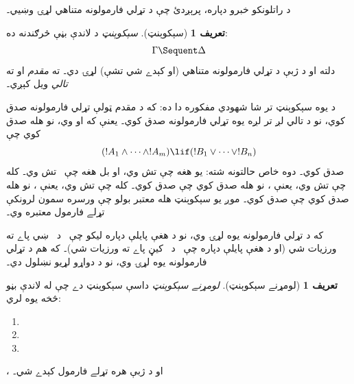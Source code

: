 \documentclass[12pt,a4paper,oneside]{report}
\theoremstyle{definition}
\newtheorem{defn}[thm]{تعريف}
\newenvironment{explain}{}{}
\begin{document}
\label{olpseg:OLP-0070-B005:start}
\label{olpseg:OLP-0070-B005:end}

\label{olpseg:OLP-0070-B006:start}
د راتلونکو خبرو دپاره، پرېږدئ چې \LR{$\Gamma, \Delta, \Pi, \Lambda$} د
تړلي فارمولونه متناهي لړۍ وښيي۔
\label{olpseg:OLP-0070-B006:end}

\label{olpseg:OLP-0070-B007:start}
\begin{defn}[سېکوېنټ]
\emph{سېکوېنټ} د لاندې بڼې څرګندنه ده:
\[
\Gamma \Sequent \Delta
\]
دلته \LR{$\Gamma$} او \LR{$\Delta$} د ژبې  د تړلي فارمولونه متناهي
(او کېدے شي تشې) لړۍ دي۔ \LR{$\Gamma$} ته \emph{مقدم} او \LR{$\Delta$} ته
\emph{تالي} ويل کېږي۔
\end{defn}
\label{olpseg:OLP-0070-B007:end}

\label{olpseg:OLP-0070-B008:start}
\begin{explain}
د يوه سېکوېنټ تر شا شهودي مفکوره دا ده: که د مقدم ټولې تړلي فارمولونه
صدق کوي، نو د تالي لږ تر لږه يوه تړلي فارمولونه صدق کوي۔ يعنې که
 او
 وي، نو \LR{$\Gamma \Sequent \Delta$}
هله صدق کوي چې
\[
(!A_1 \land \cdots \land !A_m) \lif (!B_1 \lor \cdots \lor
!B_n)
\]
صدق کوي۔ دوه خاص حالتونه شته: يو هغه چې \LR{$\Gamma$} تش وي، او بل هغه
چې \LR{$\Delta$}~تش وي۔ کله چې \LR{$\Gamma$} تش وي، يعنې ، نو \LR{$\quad
\Sequent \Delta$} هله صدق کوي چې  صدق
کوي۔ کله چې \LR{$\Delta$} تش وي، يعنې ، نو \LR{$\Gamma \Sequent \quad$}
هله صدق کوي چې  صدق کوي۔
موږ يو سېکوېنټ هله معتبر بولو چې ورسره سمون لرونکې تړلے فارمول
معتبره وي۔
\end{explain}
\label{olpseg:OLP-0070-B008:end}

\label{olpseg:OLP-0070-B009:start}
که \LR{$\Gamma$} د تړلي فارمولونه يوه لړۍ وي، نو  د هغې
پايلې دپاره ليکو چې~ د~\LR{$\Gamma$} ښي پاے ته ورزيات شي (او  د هغې پايلې دپاره چې~ د~\LR{$\Gamma$} کيڼ پاے ته ورزيات
شي)۔ که \LR{$\Delta$} هم د تړلي فارمولونه يوه لړۍ وي، نو \LR{$\Gamma,
\Delta$} د دواړو لړيو نښلول دي۔
\label{olpseg:OLP-0070-B009:end}

\label{olpseg:OLP-0070-B010:start}
\begin{defn}[لومړنے سېکوېنټ]
\emph{لومړنے سېکوېنټ} داسې سېکوېنټ دے
چې له لاندې بڼو څخه يوه لري:
  \begin{enumerate}
    \item {}
    \item \LR{$\quad \Sequent \ltrue$}
    \item \LR{$\lfalse \Sequent \quad$}
  \end{enumerate}، او  د ژبې هره تړلے فارمول
کېدے شي۔
\end{defn}
\label{olpseg:OLP-0070-B010:end}
\end{document}

